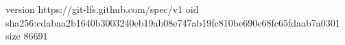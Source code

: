 version https://git-lfs.github.com/spec/v1
oid sha256:cdabaa2b1640b3003240eb19ab08e747ab19fc810be690e68fc65fdaab7a0301
size 86691
